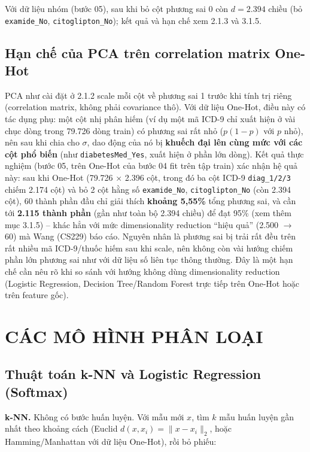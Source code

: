 \documentclass[a4paper]{report}
\begin{document}
Với dữ liệu nhóm (bước 05), sau khi bỏ cột phương sai 0 còn $d = 2.394$ chiều (bỏ \texttt{examide\_\allowbreak{}No}, \texttt{citoglipton\_\allowbreak{}No}); kết quả và hạn chế xem 2.1.3 và 3.1.5.

\subsection{Hạn chế của PCA trên correlation matrix One-Hot}

PCA như cài đặt ở 2.1.2 scale mỗi cột về phương sai 1 trước khi tính trị riêng (correlation matrix, không phải covariance thô). Với dữ liệu One-Hot, điều này có tác dụng phụ: một cột nhị phân hiếm (ví dụ một mã ICD-9 chỉ xuất hiện ở vài chục dòng trong 79.726 dòng train) có phương sai rất nhỏ ($p(1-p)$ với $p$ nhỏ), nên sau khi chia cho $\sigma$, dao động của nó bị \textbf{khuếch đại lên cùng mức với các cột phổ biến} (như \texttt{diabetesMed\_\allowbreak{}Yes}, xuất hiện ở phần lớn dòng). Kết quả thực nghiệm (bước 05, trên One-Hot của bước 04 fit trên tập train) xác nhận hệ quả này: sau khi One-Hot (79.726 × 2.396 cột, trong đó ba cột ICD-9 \texttt{diag\_\allowbreak{}1/\allowbreak{}2/\allowbreak{}3} chiếm 2.174 cột) và bỏ 2 cột hằng số \texttt{examide\_\allowbreak{}No}, \texttt{citoglipton\_\allowbreak{}No} (còn 2.394 cột), 60 thành phần đầu chỉ giải thích \textbf{khoảng 5,55\%} tổng phương sai, và cần tới \textbf{2.115 thành phần} (gần như toàn bộ 2.394 chiều) để đạt 95\% (xem thêm mục 3.1.5) – khác hẳn với mức dimensionality reduction “hiệu quả” (2.500 $\rightarrow$ 60) mà Wang (CS229) \cite{tl8} báo cáo. Nguyên nhân là phương sai bị trải rất đều trên rất nhiều mã ICD-9/thuốc hiếm sau khi scale, nên không còn vài hướng chiếm phần lớn phương sai như với dữ liệu số liên tục thông thường. Đây là một hạn chế cần nêu rõ khi so sánh với hướng không dùng dimensionality reduction (Logistic Regression, Decision Tree/Random Forest trực tiếp trên One-Hot hoặc trên feature gốc).

\section{CÁC MÔ HÌNH PHÂN LOẠI}

\subsection{Thuật toán k-NN và Logistic Regression (Softmax)}

\textbf{k-NN.} Không có bước huấn luyện. Với mẫu mới $x$, tìm $k$ mẫu huấn luyện gần nhất theo khoảng cách (Euclid $d(x,x_i)=\lVert x-x_i\rVert_2$, hoặc Hamming/Manhattan với dữ liệu One-Hot), rồi bỏ phiếu:
\end{document}
